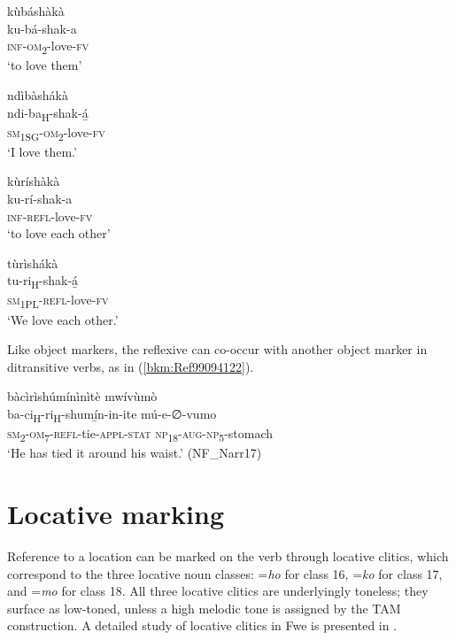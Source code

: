 \ea
\label{bkm:Ref445989915}
\glll kùbáshàkà\\
ku-bá-shak-a\\
\textsc{inf}-\textsc{om}\textsubscript{2}-love-\textsc{fv}\\
\glt ‘to love them’
\z

\ea
\glll ndìbàshákà\\
ndi-ba\textsubscript{H}-shak-á̲\\
\textsc{sm}\textsubscript{1SG}-\textsc{om}\textsubscript{2}-love-\textsc{fv}\\
\glt ‘I love them.’
\z

\ea
\glll kùríshàkà\\
ku-rí-shak-a\\
\textsc{inf}-\textsc{refl}-love-\textsc{fv}\\
\glt ‘to love each other’
\z

\ea
\label{bkm:Ref445989917}
\glll tùrìshákà\\
tu-ri\textsubscript{H}-shak-á̲\\
\textsc{sm}\textsubscript{1PL}-\textsc{refl}-love-\textsc{fv}\\
\glt ‘We love each other.’
\z

Like object markers, the reflexive can co-occur with another object marker in ditransitive verbs, as in (\ref{bkm:Ref99094122}).

\ea
\label{bkm:Ref99094122}
bàcìrìshúmínìnìtè mwívùmò\\
\gll ba-ci\textsubscript{H}-ri\textsubscript{H}-shumí̲n-in-ite    mú-e-∅-vumo\\
\textsc{sm}\textsubscript{2}-\textsc{om}\textsubscript{7}-\textsc{refl}-tie-\textsc{appl}-\textsc{stat}  \textsc{np}\textsubscript{18}-\textsc{aug}-\textsc{np}\textsubscript{5}-stomach\\
\glt ‘He has tied it around his waist.’ (NF\_Narr17)
\z
\section{Locative marking}
\label{bkm:Ref451257563}\hypertarget{Toc75352676}{}
Reference to a location can be marked on the verb through locative clitics, which correspond to the three locative noun classes: =\textit{ho} for class 16, =\textit{ko} for class 17, and =\textit{mo} for class 18. All three locative clitics are underlyingly toneless; they surface as low-toned, unless a high melodic tone is assigned by the TAM construction. A detailed study of locative clitics in Fwe is presented in {\citet{Gunnink2017}}.

